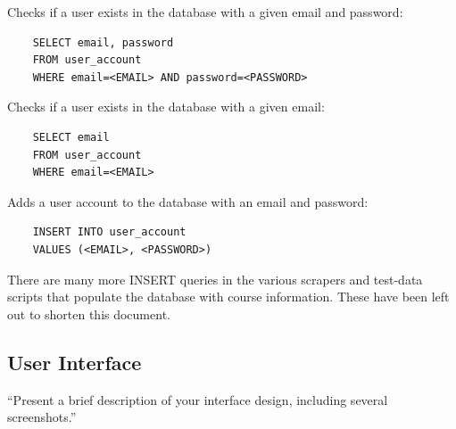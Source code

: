 \documentclass[twoside=false,a4paper,11pt]{article}
\theoremstyle{mytheor}
\begin{document}
Checks if a user exists in the database with a given email and password:
\begin{lstlisting}
    SELECT email, password
    FROM user_account
    WHERE email=<EMAIL> AND password=<PASSWORD>
\end{lstlisting}

Checks if a user exists in the database with a given email:
\begin{lstlisting}
    SELECT email
    FROM user_account
    WHERE email=<EMAIL>
\end{lstlisting}

Adds a user account to the database with an email and password:
\begin{lstlisting}
    INSERT INTO user_account
    VALUES (<EMAIL>, <PASSWORD>)
\end{lstlisting}

There are many more INSERT queries in the various scrapers and test-data scripts that populate the database with course information. These have been left out to shorten this document.

\subsection*{User Interface}

``Present a brief description of your interface design, including several screenshots.''
\end{document}
